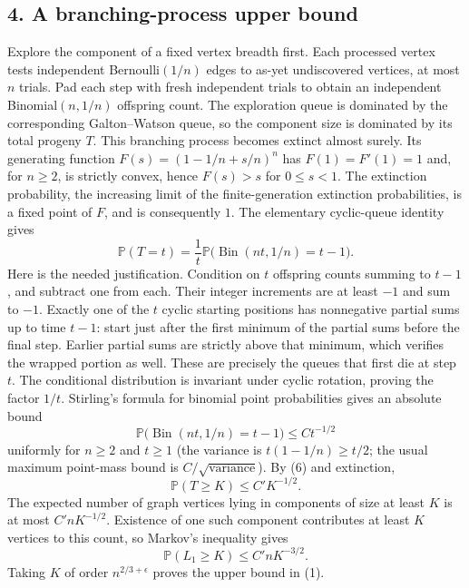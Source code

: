 \subsection*{4. A branching-process upper bound}
Explore the component of a fixed vertex breadth first. Each processed vertex tests independent Bernoulli$(1/n)$ edges to as-yet undiscovered vertices, at most $n$ trials. Pad each step with fresh independent trials to obtain an independent Binomial$(n,1/n)$ offspring count. The exploration queue is dominated by the corresponding Galton--Watson queue, so the component size is dominated by its total progeny $T$.
This branching process becomes extinct almost surely. Its generating function $F(s)=(1-1/n+s/n)^n$ has $F(1)=F'(1)=1$ and, for $n\ge2$, is strictly convex, hence $F(s)>s$ for $0\le s<1$. The extinction probability, the increasing limit of the finite-generation extinction probabilities, is a fixed point of $F$, and is consequently $1$.
The elementary cyclic-queue identity gives
\[
 \mathbb P(T=t)=\frac1t\mathbb P\bigl(\operatorname{Bin}(nt,1/n)=t-1\bigr). \tag{6}
\]
Here is the needed justification. Condition on $t$ offspring counts summing to $t-1$, and subtract one from each. Their integer increments are at least $-1$ and sum to $-1$. Exactly one of the $t$ cyclic starting positions has nonnegative partial sums up to time $t-1$: start just after the first minimum of the partial sums before the final step. Earlier partial sums are strictly above that minimum, which verifies the wrapped portion as well. These are precisely the queues that first die at step $t$. The conditional distribution is invariant under cyclic rotation, proving the factor $1/t$.
Stirling's formula for binomial point probabilities gives an absolute bound
\[
 \mathbb P\bigl(\operatorname{Bin}(nt,1/n)=t-1\bigr)\le C t^{-1/2}
\]
uniformly for $n\ge2$ and $t\ge1$ (the variance is $t(1-1/n)\ge t/2$; the usual maximum point-mass bound is $C/\sqrt{\text{variance}}$). By (6) and extinction,
\[
 \mathbb P(T\ge K)\le C'K^{-1/2}. \tag{7}
\]
The expected number of graph vertices lying in components of size at least $K$ is at most $C'nK^{-1/2}$. Existence of one such component contributes at least $K$ vertices to this count, so Markov's inequality gives
\[
 \mathbb P(L_1\ge K)\le C'nK^{-3/2}.
\]
Taking $K$ of order $n^{2/3+\epsilon}$ proves the upper bound in (1).
